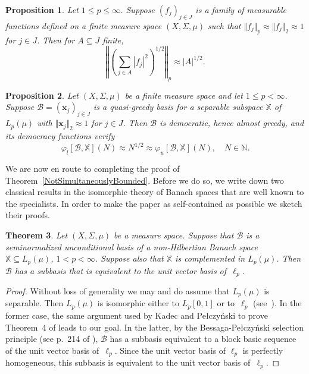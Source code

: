 \documentclass[11pt, leqno]{amsart}
\newtheorem{theorem}{Theorem}[section]
\newtheorem{proposition}[theorem]{Proposition}
\theoremstyle{remark}
\numberwithin{equation}{section}
\newcommand{\NN}{\ensuremath{\mathbb{N}}}
\newcommand{\XX}{\ensuremath{\mathbb{X}}}
\newcommand{\xx}{\ensuremath{\mathbf{x}}}
\newcommand{\BB}{\mathcal{B}}
\begin{document}
\begin{proposition}
\label{result:LdosSumEstimate} 
Let $1\le p\le \infty$. Suppose $(f_j)_{j\in J}$ is a family of measurable functions defined on a finite measure space $(X,\Sigma,\mu)$ such that
$\Vert f_j\Vert_p\approx \Vert f_j \Vert_2\approx 1$ for $j\in J$. Then for $A\subseteq J$ finite,
\[
 \left\Vert \left( \sum_{j\in A}| f_j|^2\right)^{1/2}\right\Vert_p \approx |A|^{1/2}.
\]
\end{proposition}

\begin{proposition}
\label{result:Democracy}
Let $(X,\Sigma,\mu)$  be a finite measure space and let $1\le p<\infty$. Suppose  $\BB=(\xx_j)_{j\in J}$ is a quasi-greedy basis for
a separable subspace $\XX$ of $L_p(\mu)$ with $\Vert \xx_j \Vert_2\approx 1$ for $j\in J$. 
Then $\BB$ is democratic, hence almost greedy, and
its democracy functions verify 
\[
\varphi_l[\BB,\XX](N)\approx N^{1/2}\approx \varphi_u[\BB,\XX](N),\quad N\in\NN.
\]
\end{proposition}

We are now en route to completing the proof of Theorem~\ref{NotSimultaneouslyBounded}. Before we do so, we write down two classical results in the isomorphic theory of Banach spaces that are  well known to the specialists. In order to make the paper as self-contained as possible we sketch their proofs.

\begin{theorem}
\label{result:KaPeSubbasis} 
Let $(X,\Sigma,\mu)$ be a measure space. Suppose that $\BB$ is a seminormalized unconditional basis of a non-Hilbertian Banach space $\XX\subseteq L_p(\mu)$, $1<p<\infty$. Suppose also that $\XX$ is complemented in $L_p(\mu)$. Then
$\BB$ has a subbasis that is equivalent to the unit vector basis of~$\ell_p$.
\end{theorem}

\begin{proof}
 Without loss of generality we may and do assume that $L_p(\mu)$ is separable. Then $L_p(\mu)$ is isomorphic either to $L_p[0,1]$ or to~$\ell_p$
(see~\cite{JohnsonLindes2001}).
In the former case, the same argument used by Kadec and Pe{\l}czy{\'n}ski to prove Theorem~4 of \cite{KadPel1962} leads to our goal. In the latter, by the Bessaga-Pe{\l}czy{\'n}ski selection principle (see p.~214 of \cite{BePe1958}), $\BB$ has a subbasis equivalent to a block basic sequence of the unit vector basis of~$\ell_p$.
Since the unit vector basis of $\ell_p$ is perfectly homogeneous, this subbasis is equivalent to the unit vector basis of~$\ell_p$.
\end{proof}
\end{document}
